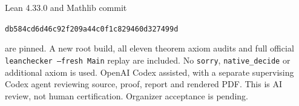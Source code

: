 \documentclass[10pt]{article}
\begin{document}
Lean 4.33.0 and Mathlib commit
\begin{center}\small\texttt{db584cd6d46c92f209a44c0f1c829460d327499d}\end{center}
are pinned. A new root build, all eleven theorem axiom audits and
full official \texttt{leanchecker --fresh Main} replay are included.
No \texttt{sorry}, \texttt{native\_decide} or additional axiom is
used. OpenAI Codex assisted, with a separate supervising Codex
agent reviewing source, proof, report and rendered PDF. This is
AI review, not human certification. Organizer acceptance is pending.
\end{document}
